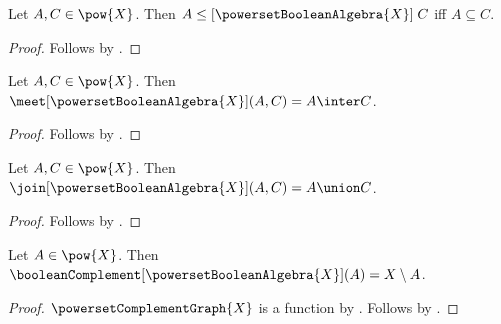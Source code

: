 \begin{proposition}\label{powerset_boolean_algebra_order_iff}
    Let $A,C\in\pow{X}$.
    Then $A\mathrel{\leq[\powersetBooleanAlgebra{X}]}C$ iff
        $A\subseteq C$.
\end{proposition}
\begin{proof}
    Follows by .
\end{proof}

\begin{proposition}\label{powerset_boolean_algebra_meet_apply}
    Let $A,C\in\pow{X}$.
    Then $\meet[\powersetBooleanAlgebra{X}](A,C)=A\inter C$.
\end{proposition}
\begin{proof}
    Follows by
        .
\end{proof}

\begin{proposition}\label{powerset_boolean_algebra_join_apply}
    Let $A,C\in\pow{X}$.
    Then $\join[\powersetBooleanAlgebra{X}](A,C)=A\union C$.
\end{proposition}
\begin{proof}
    Follows by
        .
\end{proof}

\begin{proposition}\label{powerset_boolean_algebra_complement_apply}
    Let $A\in\pow{X}$.
    Then $\booleanComplement[\powersetBooleanAlgebra{X}](A)
        =X\setminus A$.
\end{proposition}
\begin{proof}
    $\powersetComplementGraph{X}$ is a function by
        .
    Follows by
        .
\end{proof}

